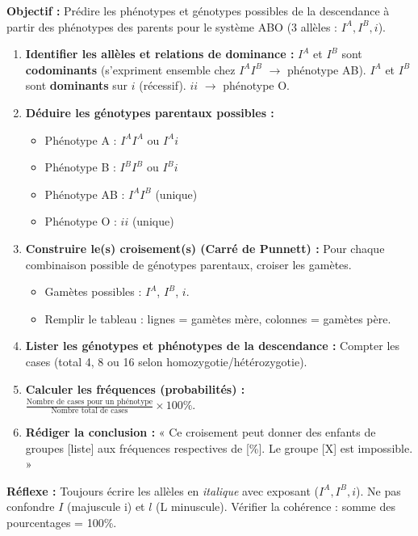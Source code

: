 \documentclass[11pt]{article}
\begin{document}
\begin{methode}
    \textbf{Objectif :} Prédire les phénotypes et génotypes possibles de la descendance à partir des phénotypes des parents pour le système ABO (3 allèles : $I^A, I^B, i$).
    \begin{enumerate}
        \item \textbf{Identifier les allèles et relations de dominance :} $I^A$ et $I^B$ sont \textbf{codominants} (s'expriment ensemble chez $I^A I^B$ $\rightarrow$ phénotype AB). $I^A$ et $I^B$ sont \textbf{dominants} sur $i$ (récessif). $ii$ $\rightarrow$ phénotype O.
        \item \textbf{Déduire les génotypes parentaux possibles :} 
        \begin{itemize}
            \item Phénotype A : $I^A I^A$ ou $I^A i$
            \item Phénotype B : $I^B I^B$ ou $I^B i$
            \item Phénotype AB : $I^A I^B$ (unique)
            \item Phénotype O : $ii$ (unique)
        \end{itemize}
        \item \textbf{Construire le(s) croisement(s) (Carré de Punnett) :} Pour chaque combinaison possible de génotypes parentaux, croiser les gamètes.
        \begin{itemize}
            \item Gamètes possibles : $I^A$, $I^B$, $i$.
            \item Remplir le tableau : lignes = gamètes mère, colonnes = gamètes père.
        \end{itemize}
        \item \textbf{Lister les génotypes et phénotypes de la descendance :} Compter les cases (total 4, 8 ou 16 selon homozygotie/hétérozygotie).
        \item \textbf{Calculer les fréquences (probabilités) :} $\frac{\text{Nombre de cases pour un phénotype}}{\text{Nombre total de cases}} \times 100\%$.
        \item \textbf{Rédiger la conclusion :} « Ce croisement peut donner des enfants de groupes [liste] aux fréquences respectives de [\%]. Le groupe [X] est impossible. »
    \end{enumerate}
    \textbf{Réflexe :} Toujours écrire les allèles en \emph{italique} avec exposant ($I^A, I^B, i$). Ne pas confondre $I$ (majuscule i) et $l$ (L minuscule). Vérifier la cohérence : somme des pourcentages = 100\%.
\end{methode}
\end{document}
